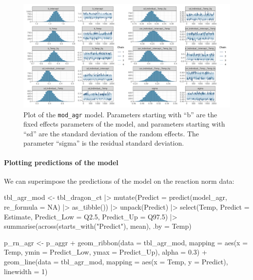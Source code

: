 \documentclass[a4paper,12pt,twoside]{article}
\begin{document}
\begin{figure}[t!h!]
  \includegraphics[width = \textwidth]{Aggressiveness_continuous_model.png}
  \caption{Plot of the \texttt{mod\_agr} model. Parameters starting with ``b'' are the fixed effects parameters of the model, and parameters starting with ``sd'' are the standard deviation of the random effects. The parameter ``sigma'' is the residual standard deviation.}
  \label{fig_mod_agr_ct}
\end{figure}

\paragraph{Plotting predictions of the model}
We can superimpose the predictions of the model on the reaction norm data:
\begin{Rinput}
tbl_agr_mod <-
    tbl_dragon_ct |>
    mutate(Predict = predict(model_agr, re_formula = NA) |>
                     as_tibble()) |>
    unpack(Predict) |>
    select(Temp,
           Predict = Estimate,
           Predict_Low = Q2.5,
           Predict_Up  = Q97.5) |>
    summarise(across(starts_with("Predict"), mean),
              .by = Temp)

p_rn_agr <-
    p_aggr +
    geom_ribbon(data = tbl_agr_mod,
                mapping = aes(x = Temp, ymin = Predict_Low, ymax = Predict_Up),
                alpha = 0.3) +
    geom_line(data = tbl_agr_mod,
              mapping = aes(x = Temp, y = Predict),
              linewidth = 1)
\end{Rinput}
\end{document}
